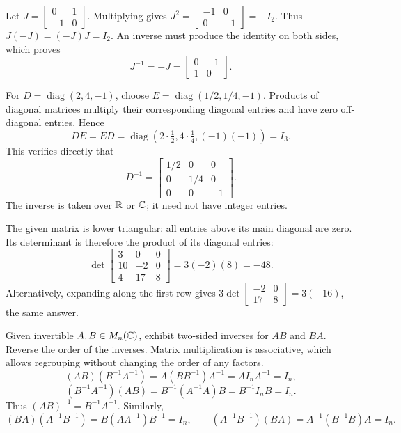 Let $J=\begin{bmatrix}0&1\\-1&0\end{bmatrix}$. Multiplying gives
$J^2=\begin{bmatrix}-1&0\\0&-1\end{bmatrix}=-I_2$.
Thus $J(-J)=(-J)J=I_2$. An inverse must produce the identity on both sides,
which proves
\[
\boxed{J^{-1}=-J=\begin{bmatrix}0&-1\\1&0\end{bmatrix}}.
\]

For $D=\operatorname{diag}(2,4,-1)$, choose
$E=\operatorname{diag}(1/2,1/4,-1)$. Products of diagonal matrices multiply
their corresponding diagonal entries and have zero off-diagonal entries.
Hence
\[
DE=ED=\operatorname{diag}(2\cdot\tfrac12,4\cdot\tfrac14,(-1)(-1))=I_3.
\]
This verifies directly that
\[
\boxed{D^{-1}=\begin{bmatrix}1/2&0&0\\0&1/4&0\\0&0&-1\end{bmatrix}}.
\]
The inverse is taken over $\mathbb{R}$ or $\mathbb{C}$; it need not have integer entries.

The given matrix is lower triangular: all entries above its main diagonal
are zero. Its determinant is therefore the product of its diagonal entries:
\[
\det\begin{bmatrix}3&0&0\\10&-2&0\\4&17&8\end{bmatrix}
=3(-2)(8)=\boxed{-48}.
\]
Alternatively, expanding along the first row gives
$3\det\begin{bmatrix}-2&0\\17&8\end{bmatrix}=3(-16)$, the same answer.

\goal Given invertible $A,B\in M_n(\mathbb{C})$, exhibit two-sided inverses for
$AB$ and $BA$.
\idea Reverse the order of the inverses. Matrix multiplication is associative,
which allows regrouping without changing the order of any factors.
\[
(AB)(B^{-1}A^{-1})=A(BB^{-1})A^{-1}=AI_nA^{-1}=I_n,
\]
\[
(B^{-1}A^{-1})(AB)=B^{-1}(A^{-1}A)B=B^{-1}I_nB=I_n.
\]
Thus $(AB)^{-1}=B^{-1}A^{-1}$.
Similarly,
\[
(BA)(A^{-1}B^{-1})=B(AA^{-1})B^{-1}=I_n,
\qquad
(A^{-1}B^{-1})(BA)=A^{-1}(B^{-1}B)A=I_n.
\]
